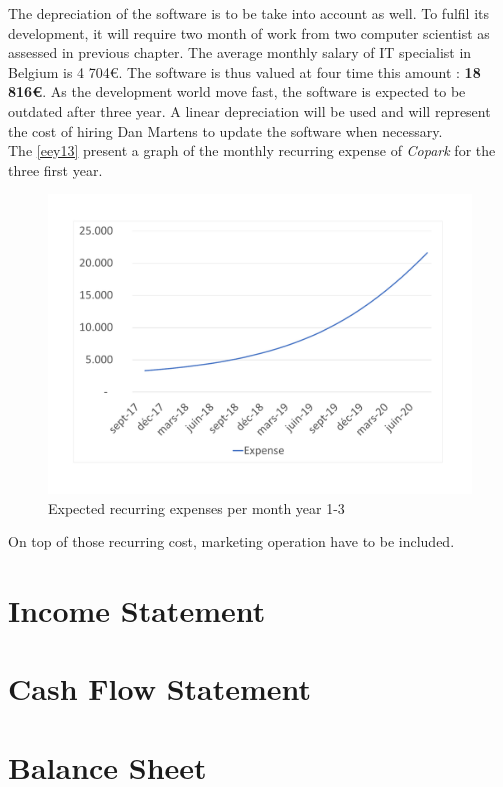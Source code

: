 \documentclass[12pt,a4paper,oneside]{book}
\newcommand{\bp}{\textit{Copark }}
\begin{document}
The depreciation of the software is to be take into account as well. To fulfil its development, it will require two month of work from two computer scientist as assessed in previous chapter. The average monthly salary of IT specialist in Belgium is 4 704\euro{}.\cite{avslinf} The software is thus valued at four time this amount : \textbf{18 816\euro{}}. As the development world move fast, the software is expected to be outdated after three year. A linear depreciation will be used and will represent the cost of hiring Dan Martens to update the software when necessary.\\


The \autoref{eey13} present a graph of the monthly recurring expense of \bp for the three first year.

\begin{figure}[h]
\centering
\caption{Expected recurring expenses per month year 1-3}
\label{eey13}
\includegraphics[keepaspectratio=true,width=\textwidth-2cm]{../graph/expectedexp.pdf}
\end{figure}

On top of those recurring cost, marketing operation have to be included.

\section{Income Statement}

\section{Cash Flow Statement}

\section{Balance Sheet}
\end{document}
